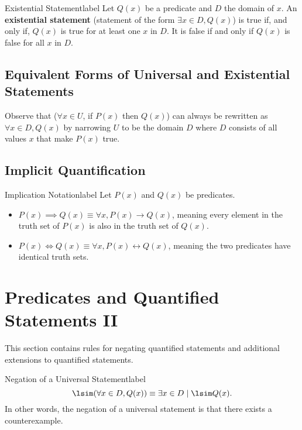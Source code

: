 \documentclass[a4paper]{report}
\begin{document}
\begin{definition}{Existential Statement}{label}
    Let $Q(x)$ be a predicate and $D$ the domain of $x$. An \textbf{existential statement} (statement
    of the form $\exists x \in D, Q(x)$) is true if, and only if, $Q(x)$ is true for at least one $x$ in $D$. 
    It is false if and only if $Q(x)$ is false for all $x$ in $D$.
\end{definition}

\subsection{Equivalent Forms of Universal and Existential Statements}

Observe that ($\forall x \in U$, if $P(x)$ then $Q(x)$) can always be rewritten as
$\forall x \in D, Q(x)$ by narrowing $U$ to be the domain $D$ where  $D$ consists of all values
$x$ that make $P(x)$ true.

\subsection{Implicit Quantification}

\begin{definition}{Implication Notation}{label}
    Let $P(x)$ and $Q(x)$ be predicates.
    \begin{itemize}
        \item $P(x) \implies Q(x) \equiv \forall x, P(x) \to Q(x)$, meaning every element in the truth
            set of $P(x)$ is also in the truth set of $Q(x)$.
        \item $P(x) \Leftrightarrow Q(x) \equiv \forall x, P(x) \leftrightarrow Q(x)$, meaning the two
            predicates have identical truth sets.
    \end{itemize}
\end{definition}

\section{Predicates and Quantified Statements II}

This section contains rules for negating quantified statements and additional extensions to quantified statements.

\begin{theorem}{Negation of a Universal Statement}{label}
    \[
    \lsim (\forall x \in D, Q(x)) \equiv \exists x \in D  \mid \lsim Q(x)
    .\] 
    In other words, the negation of a universal statement is that there exists a counterexample.
\end{theorem}
\end{document}
